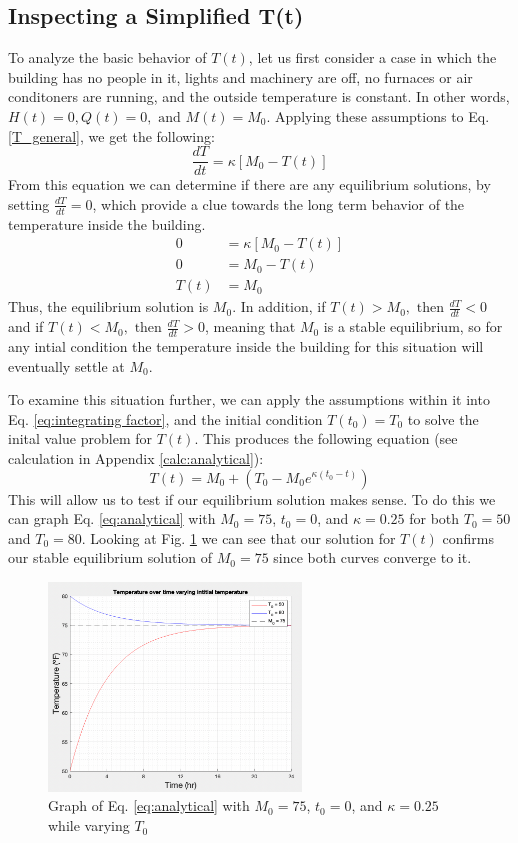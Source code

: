 \documentclass[titlepage]{article}
\begin{document}
\subsection{Inspecting a Simplified T(t)}
To analyze the basic behavior of $T(t)$, let us first consider a case in which the building 
has no people in it, lights and machinery are off, no furnaces or air conditoners are running, 
and the outside temperature is constant. In other words, $H(t) = 0, Q(t) = 0, \text{ and } M(t) = M_0$.
Applying these assumptions to Eq. \eqref{T_general}, we get the following:
\begin{equation} 
    \frac{dT}{dt} = \kappa[M_0-T(t)]
\end{equation}
From this equation we can determine if there are any equilibrium solutions, by setting $\frac{dT}{dt}=0$, which provide
a clue towards the long term behavior of the temperature inside the building.
\begin{align*}
    0 &= \kappa[M_0-T(t)]\\
    0 &= M_0-T(t) \\
    T(t) &= M_0 
\end{align*}
Thus, the equilibrium solution is $M_0$. In addition, if $T(t) > M_0, \text{ then } \frac{dT}{dt}<0$ and if
$T(t) < M_0, \text{ then } \frac{dT}{dt}>0$, meaning that $M_0$ is a stable equilibrium, so for any intial condition
the temperature inside the building for this situation will eventually settle at $M_0$.

To examine this situation further, we can apply the assumptions within it into Eq. \eqref{eq:integrating factor}, and the
initial condition $T(t_0)=T_0$  to solve the inital value problem for $T(t)$. This produces the following equation 
(see calculation in Appendix \ref{calc:analytical}):
\begin{equation}\label{eq:analytical}
    T(t) = M_0 + (T_0 - M_0 e^{\kappa (t_0-t)}) 
\end{equation}
This will allow us to test if our equilibrium solution makes sense. 
To do this we can graph Eq. \eqref{eq:analytical} with $M_0=75$, $t_0=0$, and $\kappa=0.25$ for both $T_0=50$ and $T_0=80$. 
Looking at Fig. \ref{fig:equilib1} we can see that our solution  for $T(t)$ confirms our stable equilibrium solution of $M_0=75$
since both curves converge to it.
\begin{figure}[H]
    \centering
    \includegraphics[width=0.6\textwidth]{./images/equilib1.png}
    \caption{Graph of Eq. \eqref{eq:analytical} with $M_0=75$, $t_0=0$, and $\kappa=0.25$ while varying $T_0$}
    \label{fig:equilib1}
\end{figure}
\end{document}
